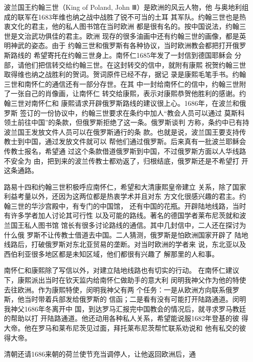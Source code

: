 波兰国王约翰三世（King of Poland, John Ⅲ）是欧洲的风云人物，他%
与奥地利组成的联军在1683年维也纳之战中战胜了锐不可当的土耳%
其军队。约翰三世也是热衷文化的君主，他的私人图书馆在当时欧洲%
都是很有名的。按中国说法，约翰三世是文治武功俱佳的君主。欧洲%
现存的很多油画中还有约翰三世的画像，都是英明神武的姿态。由于%
约翰三世和俄罗斯有各种协议，当时欧洲教会都把打开俄罗斯路线的%
希望寄托在约翰三世身上。南怀仁1685年发了一封信到德国耶稣会%
分部，请他们把信转交给约翰三世。在这封转交的信中，就附有康熙%
祝贺约翰三世取得维也纳之战胜利的贺词。贺词原件已经不存，据记%
录是康熙毛笔手书。约翰三世和南怀仁的通信还有一部分存世。在其%
中一封给南怀仁的信中，约翰三世附了一张自己的肖像画，让南怀仁%
转交给康熙，表示对康熙恭贺他胜利的感谢。约翰三世对南怀仁和%
康熙请求开辟俄罗斯路线的建议很上心。1686年，在波兰和俄罗斯%
签订的一份协议中，约翰三世要求在条约中加人“教会人员可以通过%
莫斯科领土前往中国”的条款，但俄罗斯拒绝了这一条。俄罗斯谈判%
方称，条约中已有持波兰国王发放文件人员可以在俄罗斯通行的条%
款。也就是说，波兰国王要支持传教士到中国，通过发放文件就可以%
帮他们通过俄罗斯。后来真有一批波兰耶稣会传教士报名，希望通%
过这个条款借道俄罗斯到中国，不过俄罗斯方面以人华线路不安全为%
由，把到来的波兰传教士都劝返了，归根结底，俄罗斯还是不希望打%
开这条通路。%
\par
路易十四和约翰三世积极呼应南怀仁，希望和大清康熙皇帝建立%
关系，除了国家利益考量以外，还因为这两位都是热衷学术并且对东%
方文化很感兴趣的君主。约翰三世的华沙宫殿中，有专门的中国馆，%
还有中国的花瓶。开辟陆地线路，当时有许多学者加人讨论其可行性%
以及可能的路线。著名的德国学者莱布尼茨就和波兰国王私人图书馆%
馆长有很多讨论路线的通信。其中几封信中，二人还在探讨为什么俄%
罗斯不让传教士借道去中国。二人猜测，俄罗斯是怕欧洲国家开辟了%
陆地线路后，打破俄罗斯对东北亚贸易的垄断。对当时欧洲的学者来%
说，东北亚以及西伯利亚很多地区都是未知区域，他们都很有兴趣了%
解那里的人和事。%
\par
南怀仁和康熙除了写信以外，对建立陆地线路也有切实的行动。%
在南怀仁建议下，康熙派出当时在钦天监内给南怀仁做助手的意大利%
闵明我神父作为他的特使去往欧洲。作为康熙特使，闵明我神父有两%
个任务：一是从欧洲方向联系俄罗斯，他当时带着兵部发给俄罗斯的%
信函；二是看有没有可能打开陆路通道。闵明我神父1686年冬离开中%
国，到达罗马汇报完中国教会的情况后，就寻求罗马教廷的帮助以打%
开陆路通道。他还动用各种私人关系，希望能说服1682年登基的彼%
得大帝。他在罗马和莱布尼茨见过面，拜托莱布尼茨帮忙联系劝说和%
他有私交的彼得大帝。%
\par
清朝还请1686来朝的荷兰使节充当调停人，让他返回欧洲后，通%
